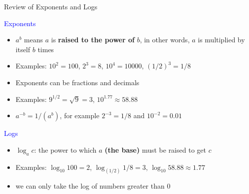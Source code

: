\documentclass[10pt,t]{beamer}
\begin{document}
\begin{frame}{Review of Exponents and Logs}
	\vspace{-5 mm}
	
	\textcolor{blue}{Exponents}
	\medskip
	\begin{itemize}
	 \item $a^b$ means $a$ is \textbf{raised to the power of} $b$, in other words, $a$ is multiplied by itself $b$ times
	\medskip
	
	\item Examples: $10^2=100$, $2^3=8$, $10^4 = 10000$, $(1/2)^3 = 1/8$
	\medskip
	
	\item Exponents can be fractions and decimals
	
	\medskip
	\item Examples: $9^{1/2}=\sqrt{9}=3$, $10^{1.77}\approx 58.88$
	\medskip
	
	\item $a^{-b}=1/(a^b)$, for example $2^{-3}=1/8$ and $10^{-2}=0.01$
	\end{itemize}
\medskip
\textcolor{blue}{Logs}
\medskip
\begin{itemize}
	\item $\log_ac$: the power to which $a$ 
	\textbf{(the base)} must be raised to get $c$
	\medskip
	\item Examples: $\log_{10}100=2$, $\log_{(1/2)}1/8=3$, $\log_{10} 58.88\approx 1.77$
	\medskip
	\item we can only take the log of numbers greater than 0
\end{itemize}

\end{frame}
\end{document}
